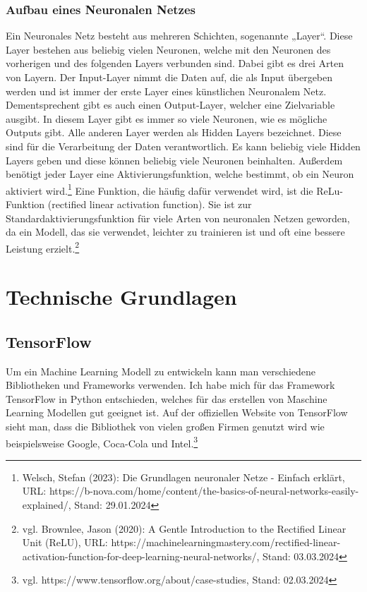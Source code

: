 \documentclass[11pt,oneside]{report}
\begin{document}
\subsection{Aufbau eines Neuronalen Netzes}
Ein Neuronales Netz besteht aus mehreren Schichten, sogenannte „Layer“. Diese Layer bestehen aus beliebig vielen Neuronen, welche mit den Neuronen des vorherigen und des folgenden Layers verbunden sind. Dabei gibt es drei Arten von Layern. Der Input-Layer nimmt die Daten auf, die als Input übergeben werden und ist immer der erste Layer eines künstlichen Neuronalem Netz. Dementsprechent gibt es auch einen Output-Layer, welcher eine Zielvariable ausgibt. In diesem Layer gibt es immer so viele Neuronen, wie es mögliche Outputs gibt. Alle anderen Layer werden als Hidden Layers bezeichnet. Diese sind für die Verarbeitung der Daten verantwortlich. Es kann beliebig viele Hidden Layers geben und diese können beliebig viele Neuronen beinhalten. Außerdem benötigt jeder Layer eine Aktivierungsfunktion, welche bestimmt, ob ein Neuron aktiviert wird.\footnote{Welsch, Stefan (2023): Die Grundlagen neuronaler Netze - Einfach erklärt, URL: https://b-nova.com/home/content/the-basics-of-neural-networks-easily-explained/, Stand: 29.01.2024} Eine Funktion, die häufig dafür verwendet wird, ist die ReLu-Funktion (rectified linear activation function). Sie ist zur Standardaktivierungsfunktion für viele Arten von neuronalen Netzen geworden, da ein Modell, das sie verwendet, leichter zu trainieren ist und oft eine bessere Leistung erzielt.\footnote{vgl. Brownlee, Jason (2020): A Gentle Introduction to the Rectified Linear Unit (ReLU), URL: https://machinelearningmastery.com/rectified-linear-activation-function-for-deep-learning-neural-networks/, Stand: 03.03.2024}


\chapter{Technische Grundlagen}

\section{TensorFlow}
Um ein Machine Learning Modell zu entwickeln kann man verschiedene Bibliotheken und Frameworks verwenden. Ich habe mich für das Framework TensorFlow in Python entschieden, welches für das erstellen von Maschine Learning Modellen gut geeignet ist. Auf der offiziellen Website von TensorFlow sieht man, dass die Bibliothek von vielen großen Firmen genutzt wird wie beispielsweise Google, Coca-Cola und Intel.\footnote{vgl. https://www.tensorflow.org/about/case-studies, Stand: 02.03.2024}
\end{document}
